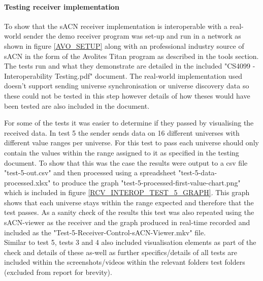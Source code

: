 \documentclass[11pt,a4paper]{article}
\begin{document}
\paragraph*{Testing receiver implementation}
To show that the sACN receiver implementation is interoperable with a real-world sender the demo receiver program was set-up and run in a network as shown in figure \ref{AVO_SETUP} along with an professional industry source of sACN in the form of the Avolites Titan program as described in the tools section. The tests run and what they demonstrate are detailed in the included "CS4099 - Interoperability Testing.pdf" document. The real-world implementation used doesn't support sending universe synchronisation or universe discovery data so these could not be tested in this step however details of how theses would have been tested are also included in the document.

For some of the tests it was easier to determine if they passed by visualising the received data. In test 5 the sender sends data on 16 different universes with different value ranges per universe. For this test to pass each universe should only contain the values within the range assigned to it as specified in the testing document. To show that this was the case the results were output to a csv file "test-5-out.csv" and then processed using a spreadsheet "test-5-data-processed.xlsx" to produce the graph "test-5-processed-first-value-chart.png" which is included in figure \ref{RCV_INTEROP_TEST_5_GRAPH}. This graph shows that each universe stays within the range expected and therefore that the test passes. As a sanity check of the results this test was also repeated using the sACN-viewer as the receiver and the graph produced in real-time recorded and included as the "Test-5-Receiver-Control-sACN-Viewer.mkv" file.\\

Similar to test 5, tests 3 and 4 also included visualisation elements as part of the check and details of these as-well as further specifics/details of all tests are included within the screenshots/videos within the relevant folders test folders (excluded from report for brevity).\\
\end{document}
